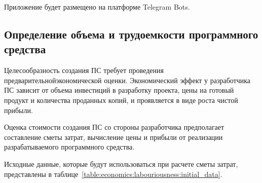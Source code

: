 Приложение будет размещено на платформе Telegram Bots.

\subsection{Определение объема и трудоемкости программного средства}
\label{sec:economics:labouriousness}

Целесообразность создания ПС требует проведения предварительной\linebreak экономической оценки. Экономический эффект у разработчика ПС зависит от объема инвестиций в разработку проекта, цены на готовый продукт и количества проданных копий, и проявляется в виде роста чистой прибыли. 

Оценка стоимости создания ПС со стороны разработчика предполагает составление сметы затрат, вычисление цены и прибыли от реализации разрабатываемого программного средства. 

Исходные данные, которые будут использоваться при расчете сметы затрат, представлены в таблице~\ref{table:economics:labouriousness:initial_data}.

